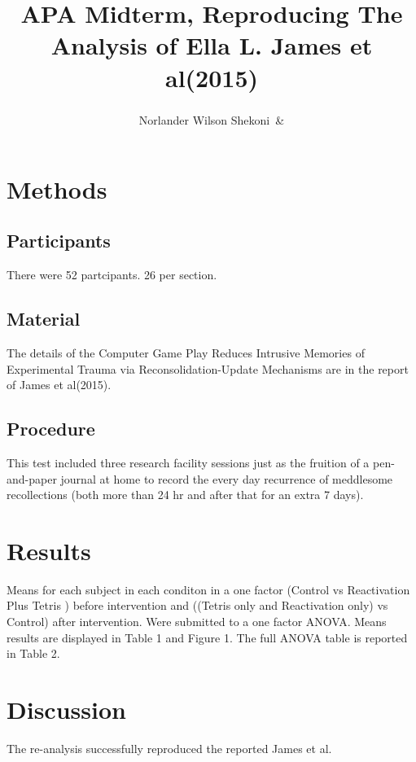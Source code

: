 \documentclass[man]{apa6}
\title{APA Midterm, Reproducing The Analysis of Ella L. James et al(2015)}
\author{Norlander Wilson Shekoni\textsuperscript{}~\&}
\date{}
\affiliation{
\vspace{0.5cm}
\textsuperscript{1} Brooklyn College City University Of New York\\\textsuperscript{} }
\begin{document}
\maketitle

\section{Methods}\label{methods}

\subsection{Participants}\label{participants}

There were 52 partcipants. 26 per section.

\subsection{Material}\label{material}

The details of the Computer Game Play Reduces Intrusive Memories of
Experimental Trauma via Reconsolidation-Update Mechanisms are in the
report of James et al(2015).

\subsection{Procedure}\label{procedure}

This test included three research facility sessions just as the fruition
of a pen-and-paper journal at home to record the every day recurrence of
meddlesome recollections (both more than 24 hr and after that for an
extra 7 days).

\section{Results}\label{results}

Means for each subject in each conditon in a one factor (Control vs
Reactivation Plus Tetris ) before intervention and ((Tetris only and
Reactivation only) vs Control) after intervention. Were submitted to a
one factor ANOVA. Means results are displayed in Table 1 and Figure 1.
The full ANOVA table is reported in Table 2.

\section{Discussion}\label{discussion}

The re-analysis successfully reproduced the reported James et al.
\end{document}
